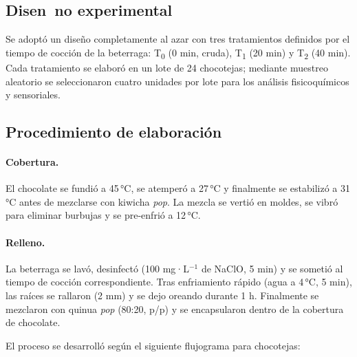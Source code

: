 \documentclass[manuscript,screen,review]{acmart}
\begin{document}
           
    \subsection{Disen~{n}o experimental}
    Se adoptó un diseño completamente al azar con tres tratamientos definidos por el tiempo de cocción de la beterraga:  
    T\textsubscript{0} (0 min, cruda),  
    T\textsubscript{1} (20 min) y  
    T\textsubscript{2} (40 min).  
    Cada tratamiento se elaboró en un lote de 24 chocotejas; mediante muestreo aleatorio se seleccionaron cuatro unidades por lote para los an\'alisis fisicoquímicos y sensoriales.
    
    \subsection{Procedimiento de elaboración}
    \paragraph{Cobertura.} El chocolate se fundió a 45\,°C, se atemperó a 27\,°C y finalmente se estabilizó a 31\,°C antes de mezclarse con kiwicha \emph{pop}.  
    La mezcla se vertió en moldes, se vibró para eliminar burbujas y se pre-enfrió a 12\,°C.
    
    \paragraph{Relleno.} La beterraga se lavó, desinfectó (100 mg·L\(^{-1}\) de NaClO, 5 min) y se sometió al tiempo de cocción correspondiente. Tras enfriamiento rápido (agua a 4\,°C, 5 min), las raíces se rallaron (2 mm) y se dejo oreando durante 1 h. Finalmente se mezclaron con quinua \emph{pop} (80:20, p/p) y se encapsularon dentro de la cobertura de chocolate.

                    El proceso se desarrolló según el siguiente flujograma para chocotejas:
                    
\end{document}
